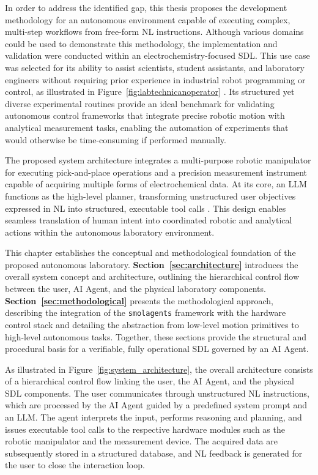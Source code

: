 
In order to address the identified gap, this thesis proposes the development methodology for an autonomous environment capable of executing complex, multi-step workflows from free-form NL instructions. Although various domains could be used to demonstrate this methodology, the implementation and validation were conducted within an electrochemistry-focused SDL. This use case was selected for its ability to assist scientists, student assistants, and laboratory engineers without requiring prior experience in industrial robot programming or control, as illustrated in Figure~\ref{fig:labtechnicanoperator} \cite{teachpendant, app13042582, quigley2009ros, angerer2010robotics}. Its structured yet diverse experimental routines provide an ideal benchmark for validating autonomous control frameworks that integrate precise robotic motion with analytical measurement tasks, enabling the automation of experiments that would otherwise be time-consuming if performed manually.

The proposed system architecture integrates a multi-purpose robotic manipulator for executing pick-and-place operations and a precision measurement instrument capable of acquiring multiple forms of electrochemical data. At its core, an LLM functions as the high-level planner, transforming unstructured user objectives expressed in NL into structured, executable tool calls \cite{doi:10.1177/1729881419851402, LAURIA2002171, wang2025function}. This design enables seamless translation of human intent into coordinated robotic and analytical actions within the autonomous laboratory environment.

This chapter establishes the conceptual and methodological foundation of the proposed autonomous laboratory. \textbf{Section~\ref{sec:architecture}} introduces the overall system concept and architecture, outlining the hierarchical control flow between the user, AI Agent, and the physical laboratory components. \textbf{Section~\ref{sec:methodological}} presents the methodological approach, describing the integration of the \texttt{smolagents} framework with the hardware control stack and detailing the abstraction from low-level motion primitives to high-level autonomous tasks. Together, these sections provide the structural and procedural basis for a verifiable, fully operational SDL governed by an AI Agent.



As illustrated in Figure~\ref{fig:system_architecture}, the overall architecture consists of a hierarchical control flow linking the user, the AI Agent, and the physical SDL components. The user communicates through unstructured NL instructions, which are processed by the AI Agent guided by a predefined system prompt and an LLM. The agent interprets the input, performs reasoning and planning, and issues executable tool calls to the respective hardware modules such as the robotic manipulator and the measurement device. The acquired data are subsequently stored in a structured database, and NL feedback is generated for the user to close the interaction loop.

